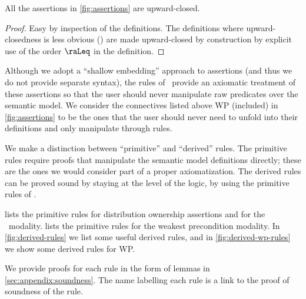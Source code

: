 \begin{proposition}
  All the assertions in \cref{fig:assertions} are upward-closed.
\end{proposition}
\begin{proof}
  Easy by inspection of the definitions.
  The definitions where upward-closedness is less obvious
  (\eg \supercond)
  are made upward-closed by construction by explicit use of
  the order $\raLeq$ in the definition.
\end{proof}

Although we adopt a ``shallow embedding'' approach to assertions
(and thus we do not provide separate syntax),
the rules of \thelogic\ provide an axiomatic treatment
of these assertions so that the user should never manipulate raw predicates
over the semantic model.
We consider the connectives listed above WP
(included) in \cref{fig:assertions} to be the ones that the user
should never need to unfold into their definitions and only manipulate
through rules.

We make a distinction between
``primitive'' and ``derived'' rules.
The primitive rules require proofs that manipulate the semantic model definitions directly; these are the ones we would consider part of a proper axiomatization.
The derived rules can be proved sound by staying at the level of the logic,
\ie by using the primitive rules of \thelogic.

 lists the primitive rules for distribution ownership assertions and for the \supercond\ modality.
 lists the primitive rules for the weakest precondition modality.
In \cref{fig:derived-rules} we list some useful derived rules,
and in \cref{fig:derived-wp-rules} we show some derived rules for WP.

We provide proofs for each rule in the form of lemmas in \cref{sec:appendix:soundness}.
The name labelling each rule is a link to the proof of soundness of the rule.

\let\RuleName\RuleNameProofLink

